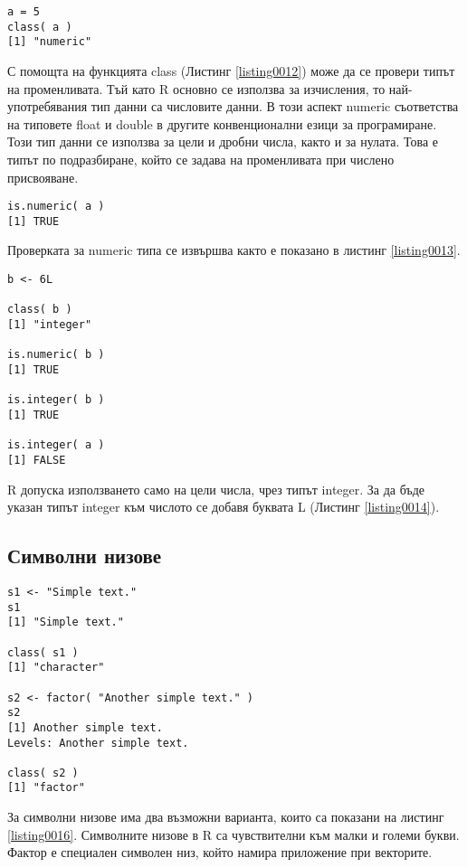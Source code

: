 \begin{lstlisting}[caption=Проверка за типа на променливата, label=listing0012]
a = 5
class( a )
[1] "numeric"
\end{lstlisting}

С помощта на функцията class (Листинг \ref{listing0012}) може да се провери типът на променливата. Тъй като R основно се използва за изчисления, то най-употребявания тип данни са числовите данни. В този аспект numeric съответства на типовете float и double в другите конвенционални езици за програмиране. Този тип данни се използва за цели и дробни числа, както и за нулата. Това е типът по подразбиране, който се задава на променливата при числено присвояване.

\begin{lstlisting}[caption=Проверка за типа numeric, label=listing0013]
is.numeric( a )
[1] TRUE
\end{lstlisting}

Проверката за numeric типа се извършва както е показано в листинг \ref{listing0013}.

\begin{lstlisting}[caption=Използване на целочислен тип, label=listing0014]
b <- 6L

class( b )
[1] "integer"

is.numeric( b )
[1] TRUE

is.integer( b )
[1] TRUE

is.integer( a )
[1] FALSE
\end{lstlisting}

R допуска използването само на цели числа, чрез типът integer. За да бъде указан типът integer към числото се добавя буквата L (Листинг \ref{listing0014}).

\subsection{Символни низове}

\begin{lstlisting}[caption=Символни низове в R, label=listing0016]
s1 <- "Simple text."
s1
[1] "Simple text."

class( s1 )
[1] "character"

s2 <- factor( "Another simple text." )
s2
[1] Another simple text.
Levels: Another simple text.

class( s2 )
[1] "factor"
\end{lstlisting}

За символни низове има два възможни варианта, които са показани на листинг \ref{listing0016}. Символните низове в R са чувствителни към малки и големи букви. Фактор е специален символен низ, който намира приложение при векторите.

